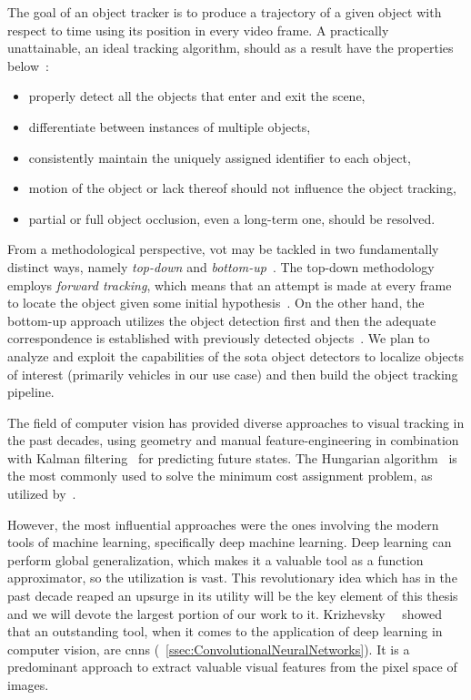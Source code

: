 The goal of an object tracker is to produce a trajectory of a given object with respect to time using its position in every video frame. A practically unattainable, an ideal tracking algorithm, should as a result have the properties below~\cite{jalal2012sotavot}:
\begin{itemize}
    \item properly detect all the objects that enter and exit the scene,
    \item differentiate between instances of multiple objects,
    \item consistently maintain the uniquely assigned identifier to each object,
    \item motion of the object or lack thereof should not influence the object tracking,
    \item partial or full object occlusion, even a long-term one, should be resolved.
\end{itemize}

From a methodological perspective, \gls{vot} may be tackled in two fundamentally distinct ways, namely \emph{top-down} and \emph{bottom-up}~\cite{jalal2012sotavot}. The top-down methodology employs \emph{forward tracking}, which means that an attempt is made at every frame to locate the object given some initial hypothesis~\cite{comaniciu2003kernel}. On the other hand, the bottom-up approach utilizes the object detection first and then the adequate correspondence is established with previously detected objects~\cite{wren1997pfinder}. We plan to analyze and exploit the capabilities of the \gls{sota} object detectors to localize objects of interest (primarily vehicles in our use case) and then build the object tracking pipeline.

The field of computer vision has provided diverse approaches to visual tracking in the past decades, \egtext{} using geometry and manual feature-engineering in combination with Kalman filtering~\cite{kalman1960linearfilter} for predicting future states. The Hungarian algorithm~\cite{kuhn1995hungarian} is the most commonly used to solve the minimum cost assignment problem, as utilized by~\cite{bawley2016simple}.

However, the most influential approaches were the ones involving the modern tools of machine learning, specifically deep machine learning. Deep learning can perform global generalization, which makes it a valuable tool as a function approximator, so the utilization is vast. This revolutionary idea which has in the past decade reaped an upsurge in its utility will be the key element of this thesis and we will devote the largest portion of our work to it. Krizhevsky~\etal{}~\cite{krizhevsky2012classification} showed that an outstanding tool, when it comes to the application of deep learning in computer vision, are \glspl{cnn} (\sectiontext{}~\ref{ssec:ConvolutionalNeuralNetworks}). It is a predominant approach to extract valuable visual features from the pixel space of images.


